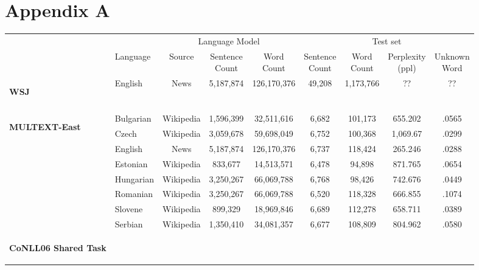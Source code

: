 \appendix
\section{Appendix A}
\label{app:lm}

\begin{table}[h]
  \begin{tabular}{l|l|c|c|c|c|c|c|c|}
    \cline{2-9}
    & & \multicolumn{3}{c|}{Language Model} & \multicolumn{4}{c|}{Test set}\\    \cline{2-9}
    & Language & Source & \specialcell{Sentence\\Count} & \specialcell{Word\\Count} & \specialcell{Sentence\\Count} & \specialcell{Word\\Count} & \specialcell{Perplexity\\(ppl)} & \specialcell{Unknown\\Word} \\ \cline{1-9}
    \multirow{1}{*}{\begin{sideways}\textbf{WSJ}\end{sideways}} 
    &English & News & 5,187,874 & 126,170,376 & 49,208 & 1,173,766 & ?? & ??\\
    & & & & && & &\\\hline
    \multirow{8}{*}{\begin{sideways}\textbf{MULTEXT-East}\end{sideways}}
    &Bulgarian& Wikipedia &1,596,399 & 32,511,616  & 6,682 & 101,173 & 655.202 & .0565\\
    &Czech & Wikipedia &3,059,678 & 59,698,049 & 6,752 & 100,368 & 1,069.67 & .0299\\
    &English & News & 5,187,874 & 126,170,376 & 6,737 & 118,424 & 265.246 & .0288\\
    &Estonian & Wikipedia &833,677 & 14,513,571 & 6,478 & 94,898 & 871.765 & .0654\\
    &Hungarian & Wikipedia &3,250,267& 66,069,788 & 6,768 & 98,426 & 742.676 & .0449\\
    &Romanian & Wikipedia &3,250,267&66,069,788  & 6,520 & 118,328 & 666.855 & .1074\\
    &Slovene & Wikipedia & 899,329&18,969,846 & 6,689 & 112,278 & 658.711 & .0389\\
    &Serbian & Wikipedia & 1,350,410 & 34,081,357 & 6,677 & 108,809 & 804.962 & .0580\\
    \hline %
    \multirow{10}{*}{\begin{sideways}\textbf{CoNLL06 Shared Task}\end{sideways}}

\end{tabular}
\end{table}
